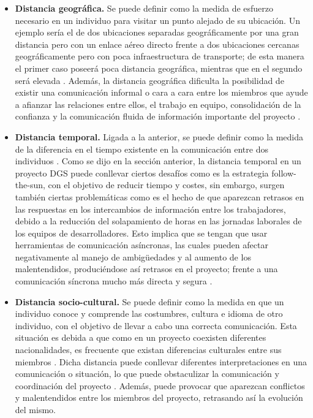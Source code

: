 \begin{itemize}
	\item \textbf{Distancia geográfica.} Se puede definir como la medida de esfuerzo necesario en un individuo para visitar un punto alejado de su ubicación. Un ejemplo sería el de dos ubicaciones separadas geográficamente por una gran distancia pero con un enlace aéreo directo frente a dos ubicaciones cercanas geográficamente pero con poca infraestructura de transporte; de esta manera el primer caso poseerá poca distancia geográfica, mientras que en el segundo será elevada \cite{vizcaino2015vision}. Además, la distancia geográfica dificulta la posibilidad de existir una comunicación informal o cara a cara entre los miembros que ayude a afianzar las relaciones entre ellos, el trabajo en equipo, consolidación de la confianza y la comunicación fluida de información importante del proyecto \cite{conchuir2006exploring}.
	
	\item \textbf{Distancia temporal.} Ligada a la anterior, se puede definir como la medida de la diferencia en el tiempo existente en la comunicación entre dos individuos \cite{vizcaino2015vision}. Como se dijo en la sección anterior, la distancia temporal en un proyecto DGS puede conllevar ciertos desafíos como es la estrategia follow-the-sun, con el objetivo de reducir tiempo y costes, sin embargo, surgen también ciertas problemáticas como es el hecho de que aparezcan retrasos en las respuestas en los intercambios de información entre los trabajadores, debido a la reducción del solapamiento de horas en las jornadas laborales de los equipos de desarrolladores. Esto implica que se tengan que usar herramientas de comunicación asíncronas, las cuales pueden afectar negativamente al manejo de ambigüedades y al aumento de los malentendidos, produciéndose así retrasos en el proyecto; frente a una comunicación síncrona mucho más directa y segura \cite{conchuir2006exploring}.
	
	\item \textbf{Distancia socio-cultural.} Se puede definir como la medida en que un individuo conoce y comprende las costumbres, cultura e idioma de otro individuo, con el objetivo de llevar a cabo una correcta comunicación. Esta situación es debida a que como en un proyecto coexisten diferentes nacionalidades, es frecuente que existan diferencias culturales entre sus miembros \cite{vizcaino2015vision}. Dicha distancia puede conllevar diferentes interpretaciones en una comunicación o situación, lo que puede obstaculizar la comunicación y coordinación del proyecto \cite{conchuir2006exploring}. Además, puede provocar que aparezcan conflictos y malentendidos entre los miembros del proyecto, retrasando así la evolución del mismo.
\end{itemize}

